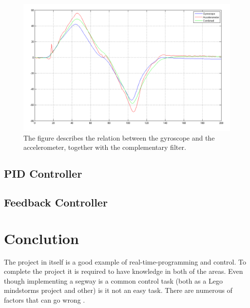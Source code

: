 \documentclass[a4paper]{article}
\begin{document}
\begin{figure}[H]
 \centering
\includegraphics[scale=0.456]{pic/GyroAccCombAng.png}
\caption{The figure describes the relation between the gyroscope and the accelerometer, together with the complementary filter.}
\end{figure}




\subsection{PID Controller}

\subsection{Feedback Controller}

\section{Conclution}
The project in itself is a good example of real-time-programming and control. To complete the project it is required to have knowledge in both of the areas. Even though implementing a segway is a common control task (both as a Lego mindstorms project and other) is it not an easy task. There are numerous of factors that can go wrong .\\
\end{document}
